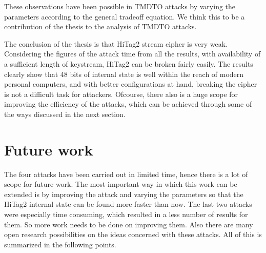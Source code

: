 These observations have been possible in TMDTO attacks by varying the parameters according to the general tradeoff equation. We think this to be a contribution of the thesis to the analysis of TMDTO attacks.

The conclusion of the thesis is that HiTag2 stream cipher is very weak. Considering the figures of the attack time from all the results, with availability of a sufficient length of keystream, HiTag2 can be broken fairly easily. The results clearly show that 48 bits of internal state is well within the reach of modern personal computers, and with better configurations at hand, breaking the cipher is not a difficult task for attackers. Ofcourse, there also is a huge scope for improving the efficiency of the attacks, which can be achieved through some of the ways discussed in the next section. 

\section{Future work}

The four attacks have been carried out in limited time, hence there is a lot of scope for future work. The most important way in which this work can be extended is by improving the attack and varying the parameters so that the HiTag2 internal state can be found more faster than now. The last two attacks were especially time consuming, which resulted in a less number of results for them. So more work needs to be done on improving them. Also there are many open research possibilities on the ideas concerned with these attacks. All of this is summarized in the following points. 


